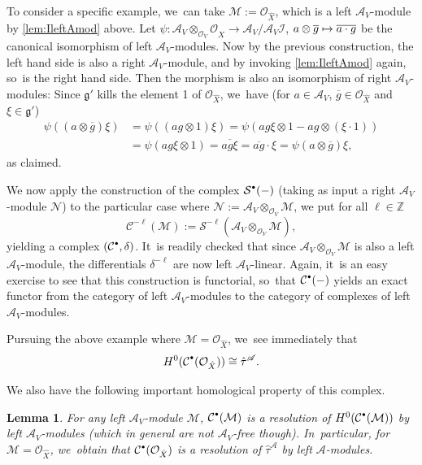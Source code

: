 \documentclass[JEP,XML,SOM,Unicode,published]{cedram}
\let\mathds\mathbb
\newcommand\mto{\mathchoice{\longmapsto}{\mapsto}{\mapsto}{\mapsto}}
\newcommand{\sbullet}{{\scriptscriptstyle\bullet}}
\newcommand{\csbullet}{{\raisebox{1pt}{$\sbullet$}}}
\newtheorem{lem}[thm]{Lemma}
\newcommand{\dZ}{{\mathds Z}}\let\mbz\dZ\let\Z\dZ
\newcommand{\cA}{\mathscr{A}}
\newcommand{\cC}{\mathcal{C}}
\newcommand{\cM}{\mathcal{M}}
\newcommand{\cN}{\mathcal{N}}
\newcommand{\cO}{\mathcal{O}}\let\O\cO
\newcommand{\cS}{\mathcal{S}}
\begin{document}
To consider a specific example, we~can take $\cM:=\cO_{\hat{X}}$, which is a left $\cA_V$\nobreakdash-mod\-ule by \cref{lem:IleftAmod} above.
Let $\psi\colon \mathscr{A}_V\otimes_{\mathcal{O}_V}\mathcal{O}_{\hat{X}}\to \mathscr{A}_V/\mathscr{A}_V\mathcal{I}$, $a\otimes \overline{g}\mto \overline{a\cdot g}$ be the canonical isomorphism of left $\mathscr{A}_V$\nobreakdash-mod\-ules. Now by the previous construction, the left hand side is also a right $\cA_V$\nobreakdash-mod\-ule, and by invoking \cref{lem:IleftAmod} again, so~is the right hand side. Then the morphism is also an isomorphism of right $\mathscr{A}_V$\nobreakdash-mod\-ules: Since $\mathfrak{g}'$ kills the element 1 of $\mathcal{O}_{\hat{X}}$, we~have (for $a\in \mathscr{A}_V$, $\overline{g}\in\cO_{\hat{X}}$ and $\xi\in \mathfrak{g}'$)
\begin{align*}
\psi((a\otimes \overline{g})\xi) &= \psi((ag\otimes 1)\xi)
= \psi(ag\xi\otimes 1 - ag\otimes (\xi\cdot 1))\\
&= \psi(ag\xi\otimes 1)= \overline{ag\xi}= \overline{ag}\cdot \xi= \psi(a\otimes \overline{g})\xi,
\end{align*}
as claimed.

We now apply the construction of the complex $\cS^{\csbullet}(-)$ (taking as input a right $\cA_V$\nobreakdash-mod\-ule $\cN$) to the particular case where $\cN:=\cA_V\otimes_{\cO_V}\cM$, \ie we put for all $\ell\in\dZ$
\[
\cC^{-\ell}(\cM):=\cS^{-\ell}(\cA_V\otimes_{\cO_V}\cM),
\]
yielding a complex $(\cC^{\csbullet}, \delta)$. It~is readily checked that since $\cA_V\otimes_{\cO_V}\cM$ is also a left $\cA_V$\nobreakdash-mod\-ule, the differentials $\delta^{-\ell}$ are now left $\cA_V$-linear. Again, it~is an easy exercise to see that this construction is functorial, so~that $\cC^{\csbullet}(-)$ yields an exact functor from the category of left $\cA_V$\nobreakdash-mod\-ules to the category of complexes of left $\cA_V$\nobreakdash-mod\-ules.

Pursuing the above example where $\cM=\cO_{\hat{X}}$, we~see immediately that
\[
H^0(\cC^{\csbullet}(\cO_{\hat{X}})) \cong \hat\tau^\cA.
\]

We also have the following important homological property of this complex.

\begin{lem}
For any left $\cA_V$\nobreakdash-mod\-ule $\cM$,
$\cC^{\csbullet}(\cM)$ is a resolution of $H^0(\cC^{\csbullet}(\cM))$ by left $\cA_V$\nobreakdash-mod\-ules
(which in general are not $\cA_V$-free though). In~particular, for $\cM=\cO_{\hat{X}}$, we~obtain
that $\cC^{\csbullet}(\cO_{\hat{X}})$ is a resolution of $\hat{\tau}^\cA$ by left $\cA$\nobreakdash-mod\-ules.
\end{lem}
\end{document}
